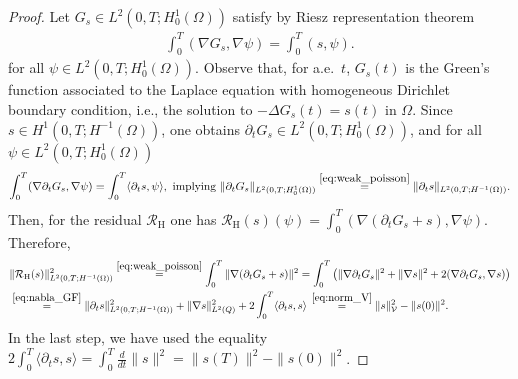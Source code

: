 \documentclass[review,11pt]{article}
\numberwithin{equation}{section}
\def \Om {\Omega}
\def \p  {\partial}
\def \calV {\mathcal{V}}
\def \calR {\mathcal{R}}
\def \resH {{\calR}_{\mathrm{H}}}
\begin{document}
\begin{proof}
 Let \( G_s \in L^2(0,T;H_0^1(\Omega)) \)  satisfy by Riesz representation theorem 
\begin{align}\label{eq:GF_test}
    \int_0^T \left(\nabla G_s,\nabla \psi\right) = \int_0^T \left(s, \psi\right).
\end{align}
for all $\psi \in L^2(0,T;H_0^1(\Omega))$.
Observe that, for a.e.\ $t$, $G_s(t)$ is the Green's function associated to the Laplace equation with homogeneous Dirichlet boundary condition, i.e., the solution to $-\Delta G_s(t) = s(t)$ in $\Omega$. Since $s\in H^1(0,T;H^{-1}(\Omega))$, one obtains $\partial_t G_s \in L^2(0,T;H_0^1(\Omega))$, and for all $\psi \in L^2(0,T;H_0^1(\Omega))$
\begin{align}\label{eq:nabla_GF}
\int_0^T (\nabla \partial_t G_s, \nabla \psi)
= \int_0^T \langle \partial_t s, \psi\rangle,\text{ implying }
\|\partial_t G_s\|_{L^2(0,T;H^1_0(\Omega))}
\overset{\eqref{eq:weak_poisson}}{=}
\|\partial_t s\|_{L^2(0,T;H^{-1}(\Omega))}.
\end{align}
Then, for the residual $\resH$ one has $\resH(s)(\psi)= \int_0^T \left( \nabla ( \partial_t G_s + s), \nabla \psi \right)$. 
Therefore,
\begin{align*}
&\| \resH(s) \|^2_{L^2(0, T;H^{-1}(\Om))}\overset{\eqref{eq:weak_poisson}}= \int_0^T \| \nabla ( \partial_t G_s + s) \|^2 = \int_0^T \left( \| \nabla \partial_t G_s \|^2 + \| \nabla s\|^2 + 2 ( \nabla \partial_t G_s, \nabla s ) \right)\\
&\overset{\eqref{eq:nabla_GF}}= \|\p_t s\|_{L^2(0,T;H^{-1}(\Om))}^2 + \|\nabla s\|_{L^2(Q)}^2 + 2 \int_0^T \langle \partial_t s, s \rangle \, \overset{\eqref{eq:norm_V}}= \|s\|_\calV^2 - \|s(0)\|^2. 
\end{align*}
In the last step, we have used the equality $2\int_0^T\langle \p_t s, s\rangle = \int_0^T \frac{d}{dt} \|s\|^2=\|s(T)\|^2 - \|s(0)\|^2$. 
\end{proof}
\end{document}
